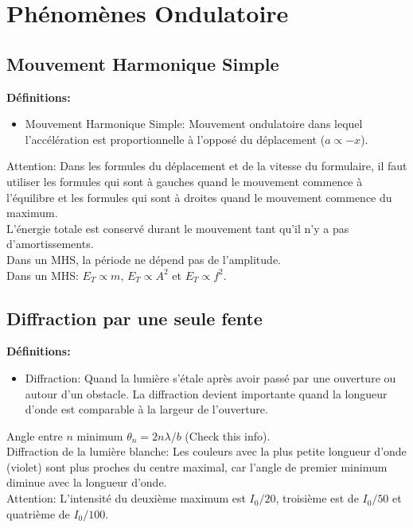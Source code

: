 \documentclass[french, a4paper, 12pt]{article}
\begin{document}
\section{Phénomènes Ondulatoire}
\subsection{Mouvement Harmonique Simple}
\textbf{Définitions:}
\begin{itemize}
\item Mouvement Harmonique Simple: Mouvement ondulatoire dans lequel l'accélération est proportionnelle à l'opposé du déplacement ($a\propto -x$).
\end{itemize}
Attention: Dans les formules du déplacement et de la vitesse du formulaire, il faut utiliser les formules qui sont à gauches quand le mouvement commence à l'équilibre et les formules qui sont à droites quand le mouvement commence du maximum.\\
L'énergie totale est conservé durant le mouvement tant qu'il n'y a pas d'amortissements.\\
Dans un MHS, la période ne dépend pas de l'amplitude.\\
Dans un MHS: $E_T \propto m$, $E_T \propto A^2$ et $E_T \propto f^2$.

\subsection{Diffraction par une seule fente}
\textbf{Définitions:}
\begin{itemize}
\item Diffraction: Quand la lumière s'étale après avoir passé par une ouverture ou autour d'un obstacle. La diffraction devient importante quand la longueur d'onde est comparable à la largeur de l'ouverture.
\end{itemize}
Angle entre $n$ minimum $\theta _n = 2n \lambda/b$ (Check this info).\\
Diffraction de la lumière blanche: Les couleurs avec la plus petite longueur d'onde (violet) sont plus proches du centre maximal, car l'angle de premier minimum diminue avec la longueur d'onde.\\
Attention: L'intensité du deuxième maximum est $I_0/20$, troisième est de $I_0/50$ et quatrième de $I_0/100$.
\end{document}
